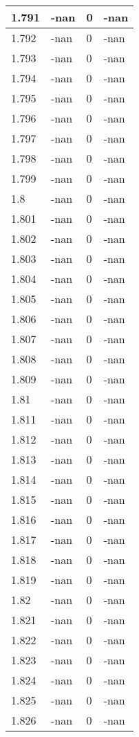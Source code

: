 \documentclass[a4paper,14pt]{extarticle}
\begin{document}
\begin{longtable}{||m{3cm}||m{3cm}|m{3cm}||m{3cm}||}
\hline
1.791 & -nan & 0 & -nan\\
\hline
1.792 & -nan & 0 & -nan\\
\hline
1.793 & -nan & 0 & -nan\\
\hline
1.794 & -nan & 0 & -nan\\
\hline
1.795 & -nan & 0 & -nan\\
\hline
1.796 & -nan & 0 & -nan\\
\hline
1.797 & -nan & 0 & -nan\\
\hline
1.798 & -nan & 0 & -nan\\
\hline
1.799 & -nan & 0 & -nan\\
\hline
1.8 & -nan & 0 & -nan\\
\hline
1.801 & -nan & 0 & -nan\\
\hline
1.802 & -nan & 0 & -nan\\
\hline
1.803 & -nan & 0 & -nan\\
\hline
1.804 & -nan & 0 & -nan\\
\hline
1.805 & -nan & 0 & -nan\\
\hline
1.806 & -nan & 0 & -nan\\
\hline
1.807 & -nan & 0 & -nan\\
\hline
1.808 & -nan & 0 & -nan\\
\hline
1.809 & -nan & 0 & -nan\\
\hline
1.81 & -nan & 0 & -nan\\
\hline
1.811 & -nan & 0 & -nan\\
\hline
1.812 & -nan & 0 & -nan\\
\hline
1.813 & -nan & 0 & -nan\\
\hline
1.814 & -nan & 0 & -nan\\
\hline
1.815 & -nan & 0 & -nan\\
\hline
1.816 & -nan & 0 & -nan\\
\hline
1.817 & -nan & 0 & -nan\\
\hline
1.818 & -nan & 0 & -nan\\
\hline
1.819 & -nan & 0 & -nan\\
\hline
1.82 & -nan & 0 & -nan\\
\hline
1.821 & -nan & 0 & -nan\\
\hline
1.822 & -nan & 0 & -nan\\
\hline
1.823 & -nan & 0 & -nan\\
\hline
1.824 & -nan & 0 & -nan\\
\hline
1.825 & -nan & 0 & -nan\\
\hline
1.826 & -nan & 0 & -nan\\

\end{longtable}
\end{document}
